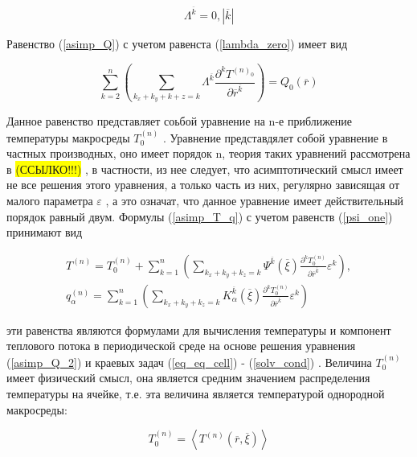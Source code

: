 \begin{equation}
    \label{lambda_zero}
    \Lambda^{ \overline{k}} = 0, \left| \overline{k} \right| 
\end{equation}

Равенство 
(\ref{asimp_Q})
с учетом равенста 
(\ref{lambda_zero})
имеет вид

\begin{equation}
    \label{asimp_Q_2}
    \sum^n_{k=2} \left( \sum_{k_x+k_y+k+z=k} \Lambda^{ \overline{k}} \frac{\partial^k T^{(n)_0}}{\partial \overline{r}^{ \overline{k}}} \right) =
    Q_0 \left( \overline{r} \right) 
\end{equation}

Данное равенство представляет соьбой уравнение на n-е приближение температуры макросреды 
$T^{(n)}_0$
. Уравнение представдялет собой уравнение в частных
производных, оно имеет порядок n, теория таких уравнений рассмотрена в 
\colorbox{yellow}{(ССЫЛКО!!!)}
, в частности, из нее следует, что асимптотический смысл имеет не 
все решения этого уравнения, а только часть из них, регулярно зависящая от малого параметра 
$\varepsilon$
, а это означат, что данное уравнение
имеет действительный порядок равный двум.
Формулы 
(\ref{asimp_T_q})
с учетом равенств 
(\ref{psi_one})
принимают вид

\begin{equation}
    \label{asimp_T_q_2}
    \begin{aligned}
        T^{(n)} = T^{(n)}_0 +
        \sum^n_{k=1} \left( \sum_{k_x+k_y+k_z=k} \Psi^{\overline{k}}(\overline{\xi})  
        \frac{\partial^kT^{(n)}_0}{\partial \overline{r}^{\overline{k}}}\varepsilon^k \right) ,
        \\
        q^{(n)}_{\alpha} = 
        \sum^n_{k=1} \left( \sum_{k_x+k_y+k_z=k} K^{\overline{k}}_{\alpha}(\overline{\xi})  
        \frac{\partial^kT^{(n)}_0}{\partial \overline{r}^{\overline{k}}}\varepsilon^k \right)
    \end{aligned}
\end{equation}

эти равенства являются формулами для вычисления температуры и компонент теплового потока в периодической среде на основе решения уравнения 
(\ref{asimp_Q_2})
и краевых задач 
(\ref{eq_eq_cell})
-
(\ref{solv_cond})
. Величина 
$T^{(n)}_0$ 
имеет физический смысл, она является средним значением распределения температуры на ячейке, т.е. эта величина является 
температурой однородной макросреды:

\begin{equation}
    T^{(n)}_0 = \left< T^{(n)} \left( \overline{r}, \overline{\xi} \right)  \right> 
\end{equation}

